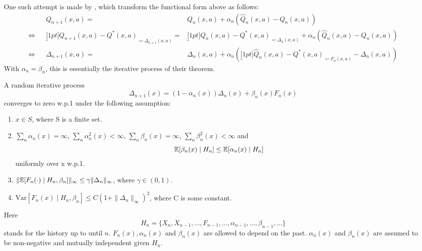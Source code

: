 One such attempt is made by \textcite{jaakkolaConvergenceStochasticIterative1994a}, which transform the functional form above as follows:
\begin{align*}
    &&Q_{n+1}(x,a)
    =&Q_n(x,a) + \alpha_n(\hat{Q}_n (x,a)-Q_n(x,a))
    \\
    \iff
    && \underbracket[1pt]{Q_{n+1}(x,a) -Q^*(x,a)}_{\eqqcolon\Delta_{n+1}(x,a)} 
    =&\underbracket[1pt]{Q_n(x,a)-Q^*(x,a) }_{\eqqcolon\Delta_n(x,a)}
    + \alpha_n(\hat{Q}_n (x,a)-Q_n(x,a))\\
    \iff&& \Delta_{n+1}(x,a) =&\Delta_n(x,a) +\alpha_n 
    (\underbracket[1pt]{\hat{Q}_n (x,a)-Q^*(x,a)}_{
        \eqqcolon F_n(x,a)
    }-\Delta_n(x,a))
\end{align*}
With \(\alpha_n=\beta_n\), this is essentially the iterative process of their theorem.

\begin{thm}\label{JAAKKOLA:THM}
    A random iterative process
    \[
        \Delta_{n+1}(x)=(1-\alpha_n(x)) \Delta_n(x) +\beta_n(x) F_n(x)
    \]
    converges to zero w.p.1 under the following assumption:
    \begin{enumerate}
        \item\label{Jaakkola:1} \(x\in S\), where S is a finite set.
        \item\label{Jaakkola:2} \(\sum_n \alpha_n(x)=\infty\), \(\sum_n \alpha_n^2(x) <\infty\), \(\sum_n\beta_n(x)=\infty\), \(\sum_n \beta_n^2 (x)<\infty\) and
        \[
            \mathbb{E}[\beta_n(x)\mid H_n]\le \mathbb{E}[\alpha_n(x)\mid H_n]
        \]
        uniformly over x w.p.1.
        \item\label{Jaakkola:3} \(\|\mathbb{E}[F_n(\cdot)\mid H_n,\beta_n]\|_\infty \le \gamma \|\Delta_n\|_\infty\), where \(\gamma \in (0,1) \).
        \item\label{Jaakkola:4} \(\text{Var}[F_n(x)\mid H_n,\beta_n]\le C(1+\|\Delta_n\|_\infty)^2\), where C is some constant.
    \end{enumerate}
    Here
    \[
        H_n=\{X_n, X_{n-1}, \dots, F_{n-1}, \dots, \alpha_{n-1},\dots, \beta_{n-1},\dots\}
    \]
    stands for the history up to until \(n\). \(F_n(x), \alpha_n(x)\) and \(\beta_n(x)\) are allowed to depend on the past. \(\alpha_n(x)\) and \(\beta_n(x)\) are assumed to be non-negative and mutually independent given \(H_n\).
\end{thm}


